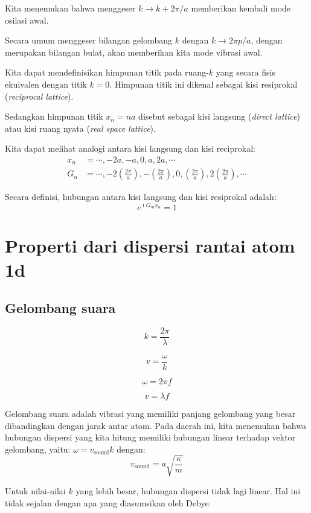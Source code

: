 Kita menemukan bahwa menggeser \(k \rightarrow k + 2\pi/a\) memberikan
kembali mode osilasi awal.

Secara umum menggeser bilangan gelombang \(k\) dengan
\(k \rightarrow 2\pi p/a\), dengan merupakan bilangan bulat, akan
memberikan kita mode vibrasi awal.

Kita dapat mendefinisikan himpunan titik pada ruang-\(k\) yang secara
fisis ekuivalen dengan titik \(k=0\). Himpunan titik ini dikenal sebagai
kisi resiprokal (\emph{reciprocal lattice}).

Sedangkan himpunan titik \(x_{n} = na\) disebut sebagai kisi langsung
(\emph{direct lattice}) atau kisi ruang nyata (\emph{real space
lattice}).

Kita dapat melihat analogi antara kisi langsung dan kisi reciprokal:
\begin{align}
x_{n} & = \cdots, -2a, -a, 0, a, 2a, \cdots \\
G_{n} & = \cdots, -2\left(\frac{2\pi}{a}\right), -\left(\frac{2\pi}{a}\right), 0, \left(\frac{2\pi}{a}\right), 2\left(\frac{2\pi}{a}\right), \cdots
\end{align}


Secara definisi, hubungan antara kisi langsung dan kisi resiprokal
adalah: \[
e^{\imath G_{m} x_{n}} = 1
\]

\section{Properti dari dispersi rantai atom 1d}

\subsection{Gelombang suara}

\[
k = \frac{2\pi}{\lambda}
\]

\[
v = \frac{\omega}{k}
\]

\[
\omega = 2 \pi f
\]

\[
v = \lambda f
\]

Gelombang suara adalah vibrasi yang memiliki panjang gelombang yang
besar dibandingkan dengan jarak antar atom. Pada daerah ini, kita
menemukan bahwa hubungan dispersi yang kita hitung memiliki hubungan
linear terhadap vektor gelombang, yaitu:
\(\omega = v_{\mathrm{sound}} k\) dengan: \[
v_{\mathrm{sound}} = a\sqrt{\frac{\kappa}{m}}
\]

Untuk nilai-nilai \(k\) yang lebih besar, hubungan dispersi tidak lagi
linear. Hal ini tidak sejalan dengan apa yang diasumsikan oleh Debye.

